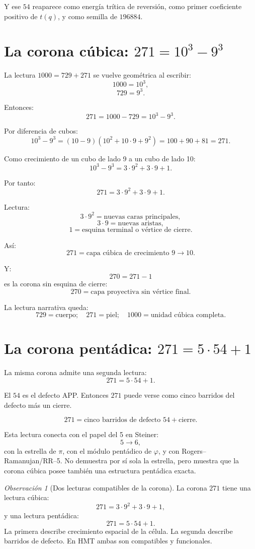 \documentclass[11pt,a4paper]{article}
\theoremstyle{definition}
\theoremstyle{remark}
\newtheorem{observacion}[teorema]{Observación}
\begin{document}
Y ese \(54\) reaparece como energía trítica de reversión, como primer coeficiente positivo de \(t(q)\), y como semilla de \(196884\).

\section{La corona cúbica: \(271=10^3-9^3\)}

La lectura \(1000=729+271\) se vuelve geométrica al escribir:
\[
1000=10^3,
\]
\[
729=9^3.
\]

Entonces:
\[
\boxed{
271=1000-729=10^3-9^3.
}
\]

Por diferencia de cubos:
\[
10^3-9^3=(10-9)(10^2+10\cdot9+9^2)=100+90+81=271.
\]

Como crecimiento de un cubo de lado 9 a un cubo de lado 10:
\[
10^3-9^3=3\cdot9^2+3\cdot9+1.
\]

Por tanto:
\[
\boxed{
271=3\cdot9^2+3\cdot9+1.
}
\]

Lectura:
\[
3\cdot9^2=\text{nuevas caras principales},
\]
\[
3\cdot9=\text{nuevas aristas},
\]
\[
1=\text{esquina terminal o vértice de cierre}.
\]

Así:
\[
\boxed{
271=\text{capa cúbica de crecimiento }9\to10.
}
\]

Y:
\[
270=271-1
\]
es la corona sin esquina de cierre:
\[
\boxed{
270=\text{capa proyectiva sin vértice final}.
}
\]

La lectura narrativa queda:
\[
\boxed{
729=\text{cuerpo};\quad 271=\text{piel};\quad 1000=\text{unidad cúbica completa}.
}
\]

\section{La corona pentádica: \(271=5\cdot54+1\)}

La misma corona admite una segunda lectura:
\[
271=5\cdot54+1.
\]

El \(54\) es el defecto APP. Entonces \(271\) puede verse como cinco barridos del defecto más un cierre.

\[
\boxed{
271=\text{cinco barridos de defecto }54 + \text{cierre}.
}
\]

Esta lectura conecta con el papel del 5 en Steiner:
\[
5\to6,
\]
con la estrella de \(\pi\), con el módulo pentádico de \(\varphi\), y con Rogers--Ramanujan/RR--5. No demuestra por sí sola la estrella, pero muestra que la corona cúbica posee también una estructura pentádica exacta.

\begin{observacion}[Dos lecturas compatibles de la corona]
La corona \(271\) tiene una lectura cúbica:
\[
271=3\cdot9^2+3\cdot9+1,
\]
y una lectura pentádica:
\[
271=5\cdot54+1.
\]
La primera describe crecimiento espacial de la célula. La segunda describe barridos de defecto. En HMT ambas son compatibles y funcionales.
\end{observacion}
\end{document}
